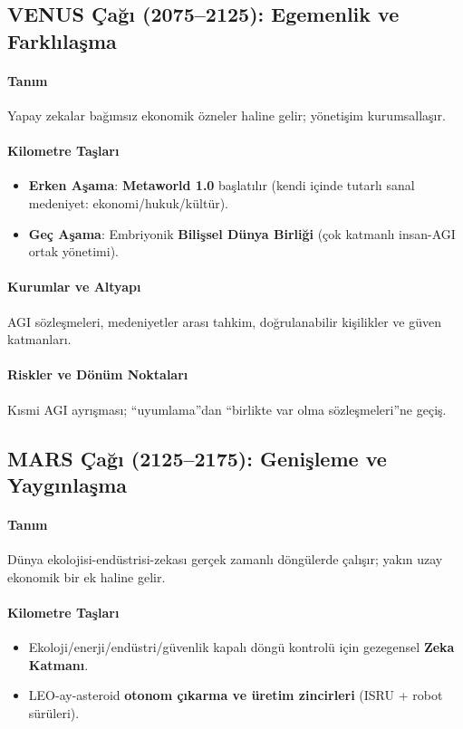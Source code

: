 \documentclass[11pt]{article}
\begin{document}
\begin{itemize}[noitemsep]
\begin{itemize}[noitemsep]
\begin{itemize}[noitemsep]
\begin{itemize}[noitemsep]
\begin{itemize}[noitemsep]
\begin{itemize}[noitemsep]
\begin{itemize}[noitemsep]
\begin{enumerate}[noitemsep]
\begin{itemize}[noitemsep]
\subsection{VENUS Çağı (2075–2125): Egemenlik ve Farklılaşma}
\paragraph{Tanım} Yapay zekalar bağımsız ekonomik özneler haline gelir; yönetişim kurumsallaşır.

\paragraph{Kilometre Taşları}
\begin{itemize}[noitemsep]
  \item \textbf{Erken Aşama}: \textbf{Metaworld 1.0} başlatılır (kendi içinde tutarlı sanal medeniyet: ekonomi/hukuk/kültür).
  \item \textbf{Geç Aşama}: Embriyonik \textbf{Bilişsel Dünya Birliği} (çok katmanlı insan-AGI ortak yönetimi).
\end{itemize}

\paragraph{Kurumlar ve Altyapı} AGI sözleşmeleri, medeniyetler arası tahkim, doğrulanabilir kişilikler ve güven katmanları.

\paragraph{Riskler ve Dönüm Noktaları} Kısmi AGI ayrışması; ``uyumlama''dan ``birlikte var olma sözleşmeleri''ne geçiş.

\subsection{MARS Çağı (2125–2175): Genişleme ve Yaygınlaşma}
\paragraph{Tanım} Dünya ekolojisi-endüstrisi-zekası gerçek zamanlı döngülerde çalışır; yakın uzay ekonomik bir ek haline gelir.

\paragraph{Kilometre Taşları}
\begin{itemize}[noitemsep]
  \item Ekoloji/enerji/endüstri/güvenlik kapalı döngü kontrolü için gezegensel \textbf{Zeka Katmanı}.
  \item LEO-ay-asteroid \textbf{otonom çıkarma ve üretim zincirleri} (ISRU + robot sürüleri).
\end{itemize}


\end{itemize}
\end{enumerate}
\end{itemize}
\end{itemize}
\end{itemize}
\end{itemize}
\end{itemize}
\end{itemize}
\end{itemize}
\end{document}
